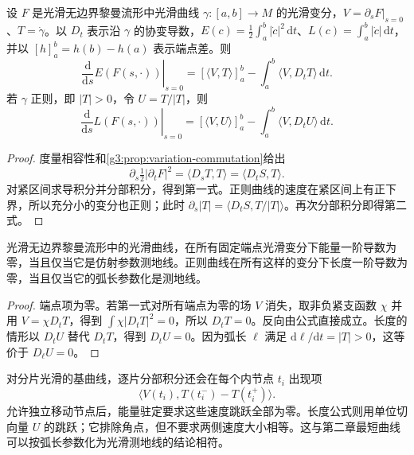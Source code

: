 \begin{theorem}[第一变分]\label{g3:thm:curve-first-variation}
	设 \(F\) 是光滑无边界黎曼流形中光滑曲线 \(\gamma:[a,b]\to M\) 的光滑变分，\(V=\partial_sF|_{s=0}\)、\(T=\dot\gamma\)。以 \(D_t\) 表示沿 \(\gamma\) 的协变导数，\(E(c)=\tfrac12\int_a^b|\dot c|^2\,\mathrm dt\)、\(L(c)=\int_a^b|\dot c|\,\mathrm dt\)，并以 \([h]_a^b=h(b)-h(a)\) 表示端点差。则
	\begin{equation}\label{g3:eq:energy-first-variation}
		\left.\frac{\mathrm d}{\mathrm ds}E(F(s,\cdot))\right|_{s=0}
		=[\langle V,T\rangle]_a^b-\int_a^b\langle V,D_tT\rangle\,\mathrm dt.
	\end{equation}
	若 \(\gamma\) 正则，即 \(|T|>0\)，令 \(U=T/|T|\)，则
	\begin{equation}\label{g3:eq:length-first-variation}
		\left.\frac{\mathrm d}{\mathrm ds}L(F(s,\cdot))\right|_{s=0}
		=[\langle V,U\rangle]_a^b-\int_a^b\langle V,D_tU\rangle\,\mathrm dt.
	\end{equation}
\end{theorem}
\begin{proof}
	度量相容性和\cref{g3:prop:variation-commutation}给出
	\[
		\partial_s\tfrac12|\partial_tF|^2
		=\langle D_sT,T\rangle=\langle D_tS,T\rangle.
	\]
	对紧区间求导积分并分部积分，得到第一式。正则曲线的速度在紧区间上有正下界，所以充分小的变分也正则；此时
	\(\partial_s|T|=\langle D_tS,T/|T|\rangle\)。再次分部积分即得第二式。
\end{proof}

\begin{corollary}\label{g3:cor:energy-critical-geodesic}
	光滑无边界黎曼流形中的光滑曲线，在所有固定端点光滑变分下能量一阶导数为零，当且仅当它是仿射参数测地线。正则曲线在所有这样的变分下长度一阶导数为零，当且仅当它的弧长参数化是测地线。
\end{corollary}
\begin{proof}
	端点项为零。若第一式对所有端点为零的场 \(V\) 消失，取非负紧支函数 \(\chi\) 并用 \(V=\chi D_tT\)，得到 \(\int\chi|D_tT|^2=0\)，所以 \(D_tT=0\)。反向由公式直接成立。长度的情形以 \(D_tU\) 替代 \(D_tT\)，得到 \(D_tU=0\)。因为弧长 \(\ell\) 满足 \(\mathrm d\ell/\mathrm dt=|T|>0\)，这等价于 \(D_\ell U=0\)。
\end{proof}

对分片光滑的基曲线，逐片分部积分还会在每个内节点 \(t_i\) 出现项
\begin{equation}\label{g3:eq:energy-corner-terms}
	\langle V(t_i),T(t_i^-)-T(t_i^+)\rangle.
\end{equation}
允许独立移动节点后，能量驻定要求这些速度跳跃全部为零。长度公式则用单位切向量 \(U\) 的跳跃；它排除角点，但不要求两侧速度大小相等。这与第二章最短曲线可以按弧长参数化为光滑测地线的结论相符。

